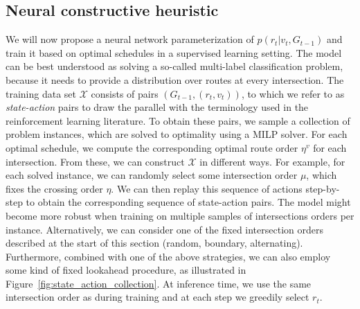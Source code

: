 \documentclass[a4paper]{article}
\theoremstyle{definition}
\theoremstyle{plain}
\begin{document}
\subsection{Neural constructive heuristic}
\label{sec:neural_constructive}

We will now propose a neural network parameterization of
$p(r_{t} | v_{t}, G_{t-1})$ and train it based on optimal schedules in a
supervised learning setting. The model can be best understood as solving a
so-called multi-label classification problem, because it needs to provide a
distribution over routes at every intersection.
%
The training data set $\mathcal{X}$ consists of pairs
$(G_{t-1}, (r_{t}, v_{t}))$, to which we refer to as \textit{state-action} pairs
to draw the parallel with the terminology used in the reinforcement learning
literature.
%
To obtain these pairs, we sample a collection of problem instances, which are
solved to optimality using a MILP solver. For each optimal schedule, we compute
the corresponding optimal route order $\eta^{v}$ for each intersection.
%
From these, we can construct $\mathcal{X}$ in different ways.
For example, for each solved instance, we can randomly select some intersection
order $\mu$, which fixes the crossing order $\eta$. We can then replay
this sequence of actions step-by-step to obtain the corresponding sequence of
state-action pairs.
The model might become more robust when training on multiple samples of
intersections orders per instance.
Alternatively, we can consider one of the fixed intersection orders
described at the start of this section (random, boundary, alternating).
Furthermore, combined with one of the above strategies, we can also employ some
kind of fixed lookahead procedure, as illustrated in
Figure~\ref{fig:state_action_collection}.
At inference time, we use the same intersection order as during training and at
each step we greedily select $r_{t}$.
\end{document}
